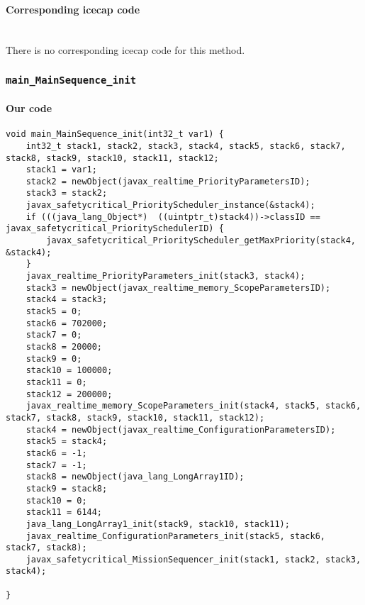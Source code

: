 \begin{landscape}
\begin{multicols}{2}
\paragraph{Corresponding icecap code}\hfill\\
There is no corresponding icecap code for this method.

\subsubsection{\texttt{main\_MainSequence\_init}}

\paragraph{Our code}\hfill
\begin{lstlisting}[firstnumber=1271]
void main_MainSequence_init(int32_t var1) {
	int32_t stack1, stack2, stack3, stack4, stack5, stack6, stack7, stack8, stack9, stack10, stack11, stack12;
	stack1 = var1;
	stack2 = newObject(javax_realtime_PriorityParametersID);
	stack3 = stack2;
	javax_safetycritical_PriorityScheduler_instance(&stack4);
	if (((java_lang_Object*)  ((uintptr_t)stack4))->classID == javax_safetycritical_PrioritySchedulerID) {
		javax_safetycritical_PriorityScheduler_getMaxPriority(stack4, &stack4);
	}
	javax_realtime_PriorityParameters_init(stack3, stack4);
	stack3 = newObject(javax_realtime_memory_ScopeParametersID);
	stack4 = stack3;
	stack5 = 0;
	stack6 = 702000;
	stack7 = 0;
	stack8 = 20000;
	stack9 = 0;
	stack10 = 100000;
	stack11 = 0;
	stack12 = 200000;
	javax_realtime_memory_ScopeParameters_init(stack4, stack5, stack6, stack7, stack8, stack9, stack10, stack11, stack12);
	stack4 = newObject(javax_realtime_ConfigurationParametersID);
	stack5 = stack4;
	stack6 = -1;
	stack7 = -1;
	stack8 = newObject(java_lang_LongArray1ID);
	stack9 = stack8;
	stack10 = 0;
	stack11 = 6144;
	java_lang_LongArray1_init(stack9, stack10, stack11);
	javax_realtime_ConfigurationParameters_init(stack5, stack6, stack7, stack8);
	javax_safetycritical_MissionSequencer_init(stack1, stack2, stack3, stack4);

}
\end{lstlisting}


\end{multicols}
\end{landscape}
